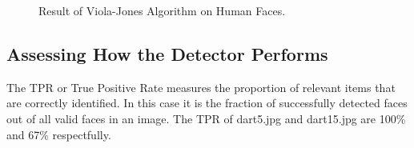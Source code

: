 \documentclass[a4paper]{article}
\begin{document}
\begin{figure}[H]
  \centering
  \hfill
   \hfill
   \hfill
   \hfill
   \hfill
   \caption{Result of Viola-Jones Algorithm on Human Faces.}
\end{figure}

\subsection*{Assessing How the Detector Performs}
\vspace{-0.7em}

The TPR or True Positive Rate measures the proportion of relevant items that
are correctly identified. In this case it is the fraction of successfully
detected faces out of all valid faces in an image. The TPR of dart5.jpg and
dart15.jpg are 100\% and 67\% respectfully.
\end{document}
